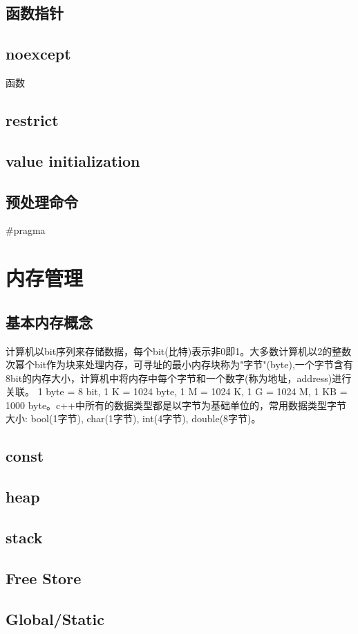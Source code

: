 \documentclass[12pt]{book}
\begin{document}
\subsection{函数指针}
\subsection{noexcept}
函数
\subsection{restrict}
\subsection{value initialization}
\subsection{预处理命令}
\#pragma

\section{内存管理}
\subsection{基本内存概念}
计算机以bit序列来存储数据，每个bit(比特)表示非0即1。大多数计算机以2的整数次幂个bit作为块来处理内存，可寻址的最小内存块称为"字节"(byte),一个字节含有8bit的内存大小，计算机中将内存中每个字节和一个数字(称为地址，address)进行关联。
1 byte = 8 bit, 1 K = 1024 byte, 1 M = 1024 K, 1 G = 1024 M, 1 KB = 1000 byte。c++中所有的数据类型都是以字节为基础单位的，常用数据类型字节大小: bool(1字节), char(1字节), int(4字节), double(8字节)。
\subsection{const}
\subsection{heap}
\subsection{stack}
\subsection{Free Store}
\subsection{Global/Static}
\end{document}
